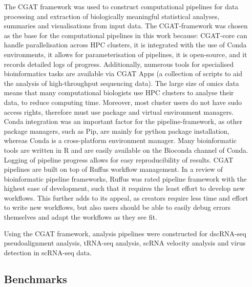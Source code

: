 The CGAT framework was used to construct computational pipelines for data processing and extraction of biologically meaningful statistical analyses, summaries and visualisations from input data.
The CGAT-framework was chosen as the base for the computational pipelines in this work because: CGAT-core can handle parallelisation across HPC clusters, it is integrated with the use of Conda environments, it allows for parameterisation of pipelines, it is open-source, and it records detailed logs of progress.
Additionally, numerous tools for specialised bioinformatics tasks are available via CGAT Apps\cite{sims2014cgat} (a collection of scripts to aid the analysis of high-throughput sequencing data).
The large size of omics data means that many computational biologists use HPC clusters to analyse their data, to reduce computing time.
Moreover, most cluster users do not have sudo access rights, therefore must use package and virtual environment managers.
Conda integration was an important factor for the pipeline-framework, as other package managers, such as Pip, are mainly for python package installation, whereas Conda is a cross-platform environment manager.
Many bioinformatic tools are written in R and are easily available on the Bioconda channel of Conda.
Logging of pipeline progress allows for easy reproducibility of results.
CGAT pipelines are built on top of Ruffus workflow management.
In a review of bioinformatic pipeline frameworks, Ruffus was rated pipeline framework with the highest ease of development, such that it requires the least effort to develop new workflows\cite{leipzig2017review}.
This further adds to its appeal, as creators require less time and effort to write new workflows, but also users should be able to easily debug errors themselves and adapt the workflows as they see fit.

Using the CGAT framework, analysis pipelines were constructed for dscRNA-seq pseudoalignment analysis, tRNA-seq analysis, scRNA velocity analysis and virus detection in scRNA-seq data.

\subsection{Benchmarks}

